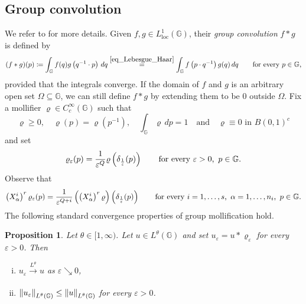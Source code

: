\documentclass[11pt]{amsart}
\renewcommand{\rho}{\varrho} %
\newcommand{\eps}{\varepsilon}
\DeclarePairedDelimiter{\norm}{\lVert}{\rVert}
\theoremstyle{plain}
\newtheorem{proposition}[theorem]{Proposition}
\theoremstyle{definition}
\theoremstyle{remark}
\numberwithin{equation}{section}
\begin{document}
\subsection{Group convolution}\label{subsec_groupconv}
We refer to \cite{MR0657581} for more details. Given $f,g \in L^1_{\mathrm{loc}}(\mathbb{G})$, their \emph{group convolution} $f*g$ is defined by
\begin{equation*}
(f*g)(p) \coloneqq \int_{\mathbb{G}} f(q)g\left(q^{-1} \cdot p\right) \, dq \overset{\eqref{eq_Lebesgue_Haar}}{=} \int_{\mathbb{G}} f\left(p \cdot q^{-1}\right)g(q) \, dq \qquad \text{for every $p \in \mathbb{G}$,}
\end{equation*}
provided that the integrals converge. If the domain of $f$ and $g$ is an arbitrary open set $\Omega \subseteq \mathbb{G}$, we can still define $f*g$ by extending them to be $0$ outside $\Omega$.
Fix a mollifier $\rho \in C_c^\infty(\mathbb{G})$ such that
\begin{equation}\label{eq_mollificatori}
\rho \geq 0, \quad \rho(p)=\rho\left(p^{-1}\right), \quad \int_{\mathbb{G}} \rho\,dp = 1 \quad \text{and} \quad \rho \equiv 0\text{ in } B(0,1)^c
\end{equation}
and set
\begin{equation} \label{eq_def_mollifier}
\rho_\varepsilon(p)=\frac{1}{\varepsilon^Q}\rho \left(\delta_{\frac{1}{\varepsilon}}(p) \right) \qquad \text{for every $\eps>0$,\, $p \in \mathbb{G}$.}
\end{equation}
Observe that
\begin{equation} \label{eq_derivative_mollification}
\left(X^i_\alpha\right)^r\rho_\varepsilon(p) =\frac{1}{\varepsilon^{Q+i}} \left(\left(X^i_\alpha\right)^r \rho\right) \left(\delta_{\frac{1}{\varepsilon}}(p) \right) \qquad \text{for every $i=1,\ldots,s$,\, $\alpha=1,\ldots,n_i$,\, $p\in\mathbb{G}$.}
\end{equation}
The following standard convergence properties of group mollification hold.
\begin{proposition} \label{prop_group_mollification}
Let $\theta \in [1,\infty)$. Let $u \in L^\theta(\mathbb{G})$ and set $u_\varepsilon=u * \rho_\varepsilon$ for every $\varepsilon>0$. Then
\begin{enumerate}[(i)]
\item $u_\eps \xrightarrow[]{L^\theta} u$ as $\varepsilon \searrow 0$,
\item $\norm*{u_\eps}_{L^\theta(\mathbb{G})} \leq \norm*{u}_{L^\theta(\mathbb{G})}$ for every $\varepsilon>0$.
\end{enumerate}
\end{proposition}
\end{document}
